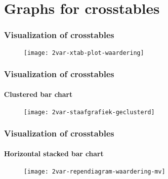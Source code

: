 \documentclass[aspectratio=169]{beamer}
\begin{document}
\section{Graphs for crosstables}

\begin{frame}
  \frametitle{Visualization of crosstables}
  
  \begin{figure}
    \centering
    \texttt{[image: 2var-xtab-plot-waardering]}
  \end{figure}
  
\end{frame}

\begin{frame}
  \frametitle{Visualization of crosstables}
  \framesubtitle{Clustered bar chart}
  
  \begin{figure}
    \centering
    \texttt{[image: 2var-staafgrafiek-geclusterd]}
  \end{figure}
  
\end{frame}

\begin{frame}
  \frametitle{Visualization of crosstables}
  \framesubtitle{Horizontal stacked bar chart}
  
  \begin{figure}
    \centering
    \texttt{[image: 2var-rependiagram-waardering-mv]}
  \end{figure}
  
\end{frame}
\end{document}
